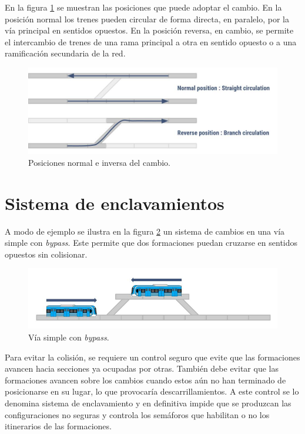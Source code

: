 			En la figura \ref{fig:Cambios} se muestran las posiciones que puede adoptar el cambio. En la posición normal los trenes pueden circular de forma directa, en paralelo, por la vía principal en sentidos opuestos. En la posición reversa, en cambio, se permite el intercambio de trenes de una rama principal a otra en sentido opuesto o a una ramificación secundaria de la red.
			
			\begin{figure}[h!]
				\centering
				\includegraphics[scale=.45]{./Figures/Cambios}
				\caption{Posiciones normal e inversa del cambio.}
				\label{fig:Cambios}
			\end{figure} 	
					
	\section{Sistema de enclavamientos}

		A modo de ejemplo se ilustra en la figura \ref{fig:Bypass} un sistema de cambios en una vía simple con \emph{bypass}. Este permite que dos formaciones puedan cruzarse en sentidos opuestos sin colisionar.
	
		\begin{figure}[h!]
			\centering
			\includegraphics[scale=.45]{./Figures/Bypass_2}
			\caption{Vía simple con \textit{bypass}.}
			\label{fig:Bypass}
		\end{figure}
			
		Para evitar la colisión, se requiere un control seguro que evite que las formaciones avancen hacia secciones ya ocupadas por otras. También debe evitar que las formaciones avancen sobre los cambios cuando estos aún no han terminado de posicionarse en su lugar, lo que provocaría descarrillamientos. A este control se lo denomina sistema de enclavamiento y en definitiva impide que se produzcan las configuraciones no seguras y controla los semáforos que habilitan o no los itinerarios de las formaciones.		
					 
